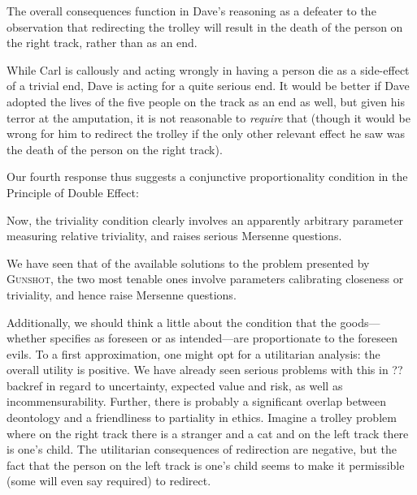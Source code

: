 The overall consequences function in Dave's reasoning as a defeater to the 
observation that redirecting the trolley will result in the death of the person on the right track, rather than as 
an end. 

While Carl is callously  and acting wrongly in having a person die as a side-effect of a trivial end, Dave is acting for a quite
serious end. It would be better if Dave adopted the lives of the five people on the track as an end as well, but given his
terror at the amputation, it is not reasonable to \textit{require} that (though it would be wrong for him to redirect the
trolley if the only other relevant effect he saw was the death of the person on the right track).

Our fourth response thus suggests a conjunctive proportionality condition in the Principle of Double Effect:

Now, the triviality condition clearly involves an apparently arbitrary parameter measuring relative triviality, and raises serious 
Mersenne questions. 

We have seen that of the available solutions to the problem presented by \textsc{Gunshot}, the two most tenable ones involve 
parameters calibrating closeness or triviality, and hence raise Mersenne questions.

Additionally, we should think a little about the condition that the goods---whether specifies as foreseen or as intended---are 
proportionate to the foreseen evils. To a first approximation, one might opt for a utilitarian analysis: the overall
utility is positive. We have already seen serious problems with this in ??backref in regard to uncertainty, expected value
and risk, as well as incommensurability. Further, there is probably a significant overlap between deontology and a friendliness
to partiality in ethics. Imagine a trolley problem where on the right track there is a stranger and a cat and on the left track
there is one's child. The utilitarian consequences of redirection are negative, but the fact that the person on the left track
is one's child seems to make it permissible (some will even say required) to redirect. 

